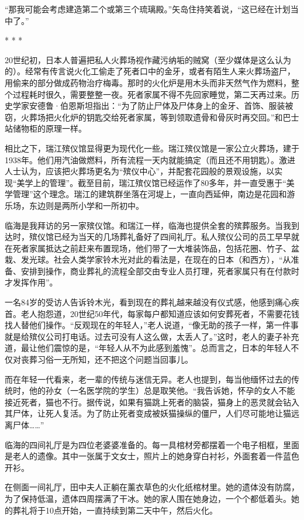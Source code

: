 \documentclass[12pt,oneside]{book}
\begin{document}
\begin{bookref}[frametitle={\cite{好好告别：世界葬礼观察手记}}]
“那我可能会考虑建造第二个或第三个琉璃殿。”矢岛住持笑着说，“这已经在计划当中了。”
\begin{center}
* * *
\end{center}

20世纪初，日本人普遍把私人火葬场视作藏污纳垢的贼窝（至少媒体是这么认为的）。经常有传言说火化工偷走了死者口中的金牙，或者有陌生人来火葬场盗尸，用偷来的部分做成药物治疗梅毒。那时的火化炉是用木头而非天然气作为燃料，整个过程耗时很久，需要整整一夜。死者家属不得不先回家睡觉，第二天再过来。历史学家安德鲁·伯恩斯坦指出：“为了防止尸体及尸体身上的金牙、首饰、服装被窃，火葬场把火化炉的钥匙交给死者家属，等到领取遗骨和骨灰时再交回。”和巴士站储物柜的原理一样。

相比之下，瑞江殡仪馆显得更为现代化一些。瑞江殡仪馆是一家公立火葬场，建于1938年。他们用汽油做燃料，所有流程一天内就能搞定（而且还不用钥匙）。激进人士认为，应该把火葬场更名为“殡仪中心”，并配套花园般的景观设施，以实现“美学上的管理”。截至目前，瑞江殡仪馆已经运作了80多年，并一直受惠于“美学管理”这个理念。瑞江的建筑群坐落在河堤上，一直向西延伸，南边是花园和游乐场，东边则是两所小学和一所初中。

临海是我拜访的另一家殡仪馆。和瑞江一样，临海也提供全套的殡葬服务。当我到达时，殡仪馆已经为当天的几场葬礼备好了四间礼厅。私人殡仪公司的员工早早就在死者家属抵达之前赶来布置现场，他们带了一大堆装饰品，包括花圈、竹子、盆栽、发光球。社会人类学家铃木光对此的看法是，在现在的日本（和西方），“从准备、安排到操作，商业葬礼的流程全部交由专业人员打理，死者家属只有在付款时才发挥作用”。

一名84岁的受访人告诉铃木光，看到现在的葬礼越来越没有仪式感，他感到痛心疾首。老人抱怨道，20世纪50年代，每家每户都知道应该如何安葬死者，不需要花钱找人替他们操作。“反观现在的年轻人，”老人说道，“像无助的孩子一样，第一件事就是给殡仪公司打电话。过去可没有人这么做，太丢人了。”这时，老人的妻子补充道，最让他们震惊的是，“年轻人从不为此感到羞愧”。总而言之，日本的年轻人不仅对丧葬习俗一无所知，还不把这个问题当回事儿。

而在年轻一代看来，老一辈的传统与迷信无异。老人也提到，每当他缅怀过去的传统时，他的孙女（一名医学院的学生）总是取笑他。“我告诉她，怀孕的女人不能接近死者，猫也不行。据传说，如果有猫跳上死者的脑袋，猫身上的恶灵就会钻入其尸体，让死人复活。为了防止死者变成被妖猫操纵的僵尸，人们尽可能地让猫远离尸体……”

临海的四间礼厅是为四位老婆婆准备的。每一具棺材旁都摆着一个电子相框，里面是老人的遗像。其中一张属于文女士，照片上的她身穿白衬衫，外面套着一件蓝色开衫。

在侧面一间礼厅，田中夫人正躺在薰衣草色的火化纸棺材里。她的遗体没有防腐，为了保持低温，遗体四周摆满了干冰。她的家人围在她身边，一个个都低着头。她的葬礼将于10点开始，一直持续到第二天中午，然后火化。


\end{bookref}
\end{document}
